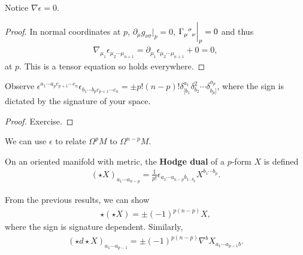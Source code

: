 \begin{lemma}
    Notice $\nabla \epsilon = 0$.
\end{lemma}

\begin{proof}
    In normal coordinates at $p$, $\partial_\mu g_{\nu \sigma} \bigg|_{p} = 0$, $\tensor{\Gamma}{_{\mu}^{\sigma}_\nu} \bigg|_{p} = 0$ and thus
    \begin{align}
        \nabla_{\mu_1} \epsilon_{\mu_2 \cdots \mu_{n+1}} = \partial_{\mu_1} \epsilon_{\mu_2 \cdots \mu_{n+1}} + 0 = 0
    ,\end{align}
    at $p$. This is a tensor equation so holds everywhere.
\end{proof}

\begin{lemma}
    Observe $\epsilon^{a_1 \cdots a_p c_{p+1} \cdots c_n} \epsilon_{b_1 \cdots b_p c_{p+1} \cdots c_n} = \pm p! \left( n - p \right)! \delta^{a_1}_{[b_1} \delta^2_{b_2} \cdots \delta^{a_p}_{b_p]}$, where the sign is dictated by the signature of your space.
\end{lemma}
\begin{proof}
    Exercise.
\end{proof}

We can use $\epsilon$ to relate $\Omega^{p} M$ to $\Omega^{n-p}M$.

\begin{definition}
    On an oriented manifold with metric, the \textbf{Hodge dual} of a $p$-form $X$ is defined
    \begin{align}
        \left( \star X \right)_{a_1 \cdots a_{n-p}} = \frac{1}{p!} \epsilon_{a_1 \cdots a_{n-p} b_{1 \cdots b_p} } X^{b_1 \cdots b_p}
    .\end{align}
\end{definition}

\begin{lemma}
    From the previous results, we can show
    \begin{align}
        \star \left( \star X \right) = \pm \left( -1 \right)^{p \left( n - p \right) } X
    ,\end{align}
    where the sign is signature dependent. Similarly,
    \begin{align}
        \left( \star d \star X \right)_{a_1 \cdots a_{p-1}} = \pm \left( -1 \right)^{p \left( n - p \right) } \nabla^{b} X_{a_1 \cdots a_{p-1} b}
    .\end{align}
\end{lemma}

